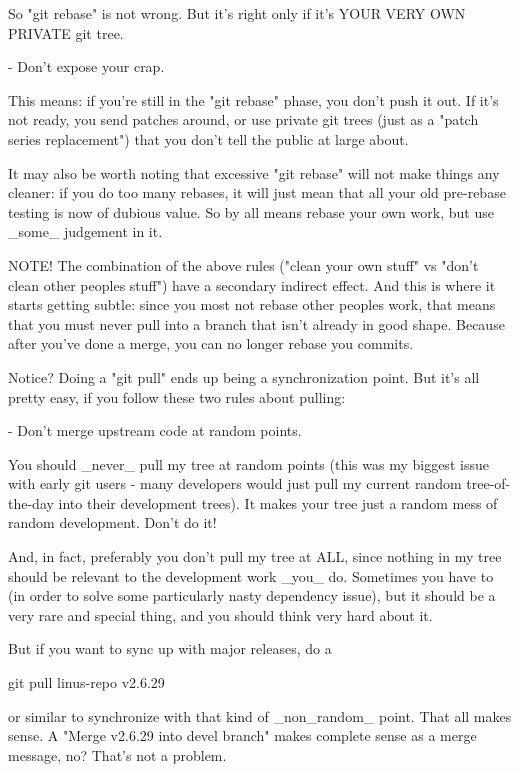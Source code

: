    So "git rebase" is not wrong. But it's right only if it's YOUR VERY OWN 
   PRIVATE git tree.

 - Don't expose your crap.

   This means: if you're still in the "git rebase" phase, you don't push 
   it out. If it's not ready, you send patches around, or use private git 
   trees (just as a "patch series replacement") that you don't tell the 
   public at large about.

It may also be worth noting that excessive "git rebase" will not make 
things any cleaner: if you do too many rebases, it will just mean that all 
your old pre-rebase testing is now of dubious value. So by all means 
rebase your own work, but use _some_ judgement in it.

NOTE! The combination of the above rules ("clean your own stuff" vs "don't 
clean other peoples stuff") have a secondary indirect effect. And this is 
where it starts getting subtle: since you most not rebase other peoples 
work, that means that you must never pull into a branch that isn't already 
in good shape. Because after you've done a merge, you can no longer rebase 
you commits.

Notice? Doing a "git pull" ends up being a synchronization point. But it's 
all pretty easy, if you follow these two rules about pulling:

 - Don't merge upstream code at random points. 

   You should _never_ pull my tree at random points (this was my biggest 
   issue with early git users - many developers would just pull my current 
   random tree-of-the-day into their development trees). It makes your 
   tree just a random mess of random development. Don't do it!

   And, in fact, preferably you don't pull my tree at ALL, since nothing 
   in my tree should be relevant to the development work _you_ do. 
   Sometimes you have to (in order to solve some particularly nasty 
   dependency issue), but it should be a very rare and special thing, and 
   you should think very hard about it.

   But if you want to sync up with major releases, do a

        git pull linus-repo v2.6.29

   or similar to synchronize with that kind of _non_random_ point. That 
   all makes sense. A "Merge v2.6.29 into devel branch" makes complete 
   sense as a merge message, no? That's not a problem.

